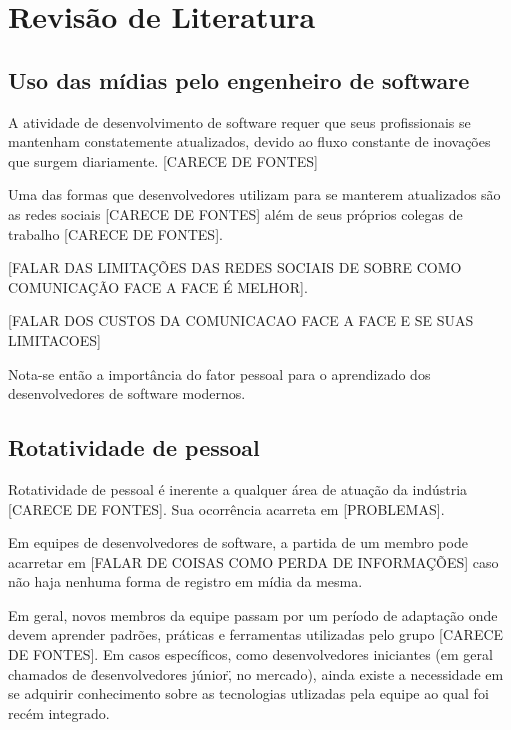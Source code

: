 \chapter{Revisão de Literatura}

\section{Uso das mídias pelo engenheiro de software}

A atividade de desenvolvimento de software requer que seus profissionais se mantenham constatemente atualizados, devido ao fluxo constante de inovações que surgem diariamente. [CARECE DE FONTES]

Uma das formas que desenvolvedores utilizam para se manterem atualizados são as redes sociais [CARECE DE FONTES] além de seus próprios colegas de trabalho [CARECE DE FONTES].

[FALAR DAS LIMITAÇÕES DAS REDES SOCIAIS DE SOBRE COMO COMUNICAÇÃO FACE A FACE É MELHOR].

[FALAR DOS CUSTOS DA COMUNICACAO FACE A FACE E SE SUAS LIMITACOES]

Nota-se então a importância do fator pessoal para o aprendizado dos desenvolvedores de software modernos.



\section{Rotatividade de pessoal}

Rotatividade de pessoal é inerente a qualquer área de atuação da indústria [CARECE DE FONTES]. Sua ocorrência acarreta em [PROBLEMAS].

Em equipes de desenvolvedores de software, a partida de um membro pode acarretar em [FALAR DE COISAS COMO PERDA DE INFORMAÇÕES] caso não haja nenhuma forma de registro em mídia da mesma.

Em geral, novos membros da equipe passam por um período de adaptação onde devem aprender padrões, práticas e ferramentas utilizadas pelo grupo [CARECE DE FONTES]. Em casos específicos, como desenvolvedores iniciantes (em geral chamados de \"desenvolvedores júnior\", no mercado), ainda existe a necessidade em se adquirir conhecimento sobre as tecnologias utlizadas pela equipe ao qual foi recém integrado.

